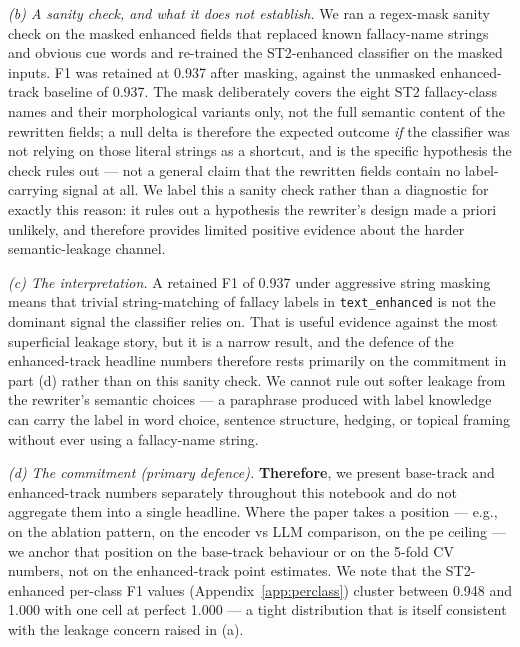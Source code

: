 \emph{(b) A sanity check, and what it does not establish.} We ran a regex-mask sanity check on the masked enhanced fields that replaced known fallacy-name strings and obvious cue words and re-trained the ST2-enhanced classifier on the masked inputs. F1 was retained at 0.937 after masking, against the unmasked enhanced-track baseline of 0.937. %
The mask deliberately covers the eight ST2 fallacy-class names and their morphological variants only, not the full semantic content of the rewritten fields; a null delta is therefore the expected outcome \emph{if} the classifier was not relying on those literal strings as a shortcut, and is the specific hypothesis the check rules out --- not a general claim that the rewritten fields contain no label-carrying signal at all. We label this a sanity check rather than a diagnostic for exactly this reason: it rules out a hypothesis the rewriter's design made a priori unlikely, and therefore provides limited positive evidence about the harder semantic-leakage channel.

\emph{(c) The interpretation.} A retained F1 of 0.937 under aggressive string masking means that trivial string-matching of fallacy labels in \texttt{text\_enhanced} is not the dominant signal the classifier relies on. That is useful evidence against the most superficial leakage story, but it is a narrow result, and the defence of the enhanced-track headline numbers therefore rests primarily on the commitment in part (d) rather than on this sanity check. We cannot rule out softer leakage from the rewriter's semantic choices --- a paraphrase produced with label knowledge can carry the label in word choice, sentence structure, hedging, or topical framing without ever using a fallacy-name string.

\emph{(d) The commitment (primary defence).} \textbf{Therefore}, we present base-track and enhanced-track numbers separately throughout this notebook and do not aggregate them into a single headline. Where the paper takes a position --- e.g., on the ablation pattern, on the encoder vs LLM comparison, on the \textsf{pe} ceiling --- we anchor that position on the base-track behaviour or on the 5-fold CV numbers, not on the enhanced-track point estimates. We note that the ST2-enhanced per-class F1 values (Appendix~\ref{app:perclass}) cluster between 0.948 and 1.000 with one cell at perfect 1.000 --- a tight distribution that is itself consistent with the leakage concern raised in (a). %

